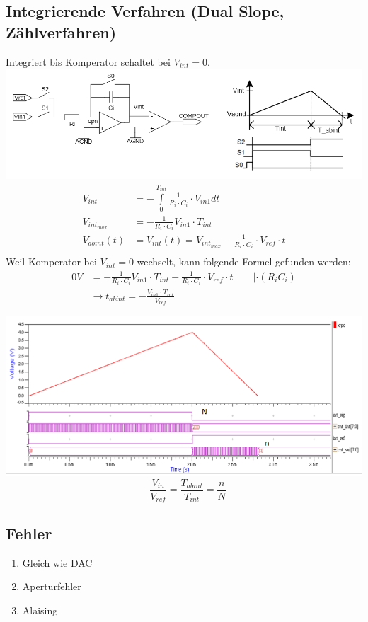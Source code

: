 \subsection{Integrierende Verfahren (Dual Slope, Zählverfahren)}
Integriert bis Komperator schaltet bei $V_{int} = 0$.\\
\includegraphics[width=\columnwidth]{Images/dual_slop_adc}
\begin{align*}
	V_{int} &= -\int\limits_{0}^{T_{int}}\frac{1}{R_i \cdot C_i}\cdot V_{in1} dt \\
	V_{int_{max}} &= -\frac{1}{R_i \cdot C_i}V_{in1}\cdot T_{int}\\
	V_{abint}(t) &= V_{int}(t) = V_{int_{max}} - \frac{1}{R_i \cdot C_i}\cdot V_{ref} \cdot t \\
\end{align*}
Weil Komperator bei $V_{int} = 0$ wechselt, kann folgende Formel gefunden werden:
\begin{align*}
	0V &= -\frac{1}{R_i \cdot C_i}V_{in1}\cdot T_{int}  - \frac{1}{R_i \cdot C_i}\cdot V_{ref} \cdot t \qquad | \cdot (R_iC_i) \\
	&\xrightarrow{} t_{abint} = -\frac{V_{in1}\cdot T_{int}}{V_{ref}}
\end{align*}

\includegraphics[width=\columnwidth]{Images/dual_slop_adc1}
\[
-\frac{V_{in}}{V_{ref}} = \frac{T_{abint}}{T_{int}} = \frac{n}{N}
\]
\subsection{Fehler}
\begin{enumerate}[nosep]
	\item Gleich wie DAC
	\item Aperturfehler
	\item Alaising
\end{enumerate}